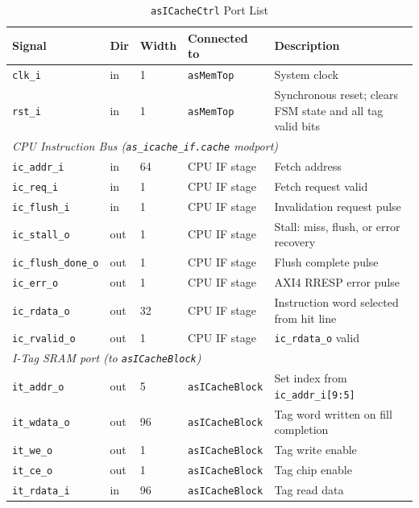 \begin{table}[H]
\caption{\texttt{asICacheCtrl} Port List}
\label{tab:asICacheCtrlPorts}
\centering
\begin{tabularx}{\textwidth}{|l |l |l |l |X|}
  \hline
  Signal & Dir & Width & Connected to & Description \\
  \hline
  \hline
  \texttt{clk\_i}  & in & 1 & \texttt{asMemTop} & System clock \\
  \hline
  \texttt{rst\_i}  & in & 1 & \texttt{asMemTop} & Synchronous reset; clears FSM state and all tag valid bits \\
  \hline
  \multicolumn{5}{|l|}{\textit{CPU Instruction Bus (\texttt{as\_icache\_if.cache} modport)}} \\
  \hline
  \texttt{ic\_addr\_i}        & in  & 64 & CPU IF stage & Fetch address \\
  \hline
  \texttt{ic\_req\_i}         & in  & 1  & CPU IF stage & Fetch request valid \\
  \hline
  \texttt{ic\_flush\_i}       & in  & 1  & CPU IF stage & Invalidation request pulse \\
  \hline
  \texttt{ic\_stall\_o}       & out & 1  & CPU IF stage & Stall: miss, flush, or error recovery \\
  \hline
  \texttt{ic\_flush\_done\_o} & out & 1  & CPU IF stage & Flush complete pulse \\
  \hline
  \texttt{ic\_err\_o}         & out & 1  & CPU IF stage & AXI4 RRESP error pulse \\
  \hline
  \texttt{ic\_rdata\_o}       & out & 32 & CPU IF stage & Instruction word selected from hit line \\
  \hline
  \texttt{ic\_rvalid\_o}      & out & 1  & CPU IF stage & \texttt{ic\_rdata\_o} valid \\
  \hline
  \multicolumn{5}{|l|}{\textit{I-Tag SRAM port (to \texttt{asICacheBlock})}} \\
  \hline
  \texttt{it\_addr\_o}  & out & 5  & \texttt{asICacheBlock} & Set index from \texttt{ic\_addr\_i[9:5]} \\
  \hline
  \texttt{it\_wdata\_o} & out & 96 & \texttt{asICacheBlock} & Tag word written on fill completion \\
  \hline
  \texttt{it\_we\_o}    & out & 1  & \texttt{asICacheBlock} & Tag write enable \\
  \hline
  \texttt{it\_ce\_o}    & out & 1  & \texttt{asICacheBlock} & Tag chip enable \\
  \hline
  \texttt{it\_rdata\_i} & in  & 96 & \texttt{asICacheBlock} & Tag read data \\

\end{tabularx}
\end{table}
